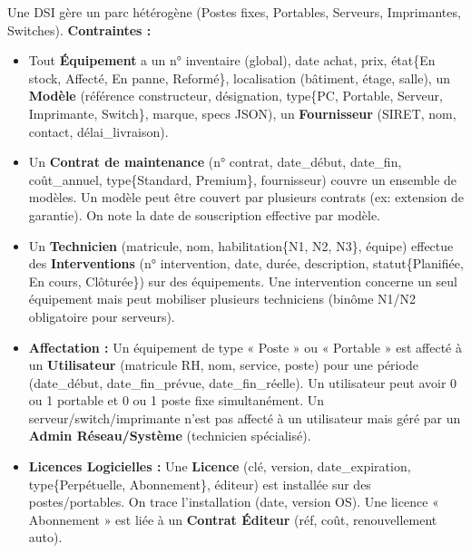 \documentclass[11pt]{article}
\begin{document}
\begin{exercice}
Une DSI gère un parc hétérogène (Postes fixes, Portables, Serveurs, Imprimantes, Switches). 
\textbf{Contraintes :}
\begin{itemize}
    \item Tout \textbf{Équipement} a un n° inventaire (global), date achat, prix, état\{En stock, Affecté, En panne, Reformé\}, localisation (bâtiment, étage, salle), un \textbf{Modèle} (référence constructeur, désignation, type\{PC, Portable, Serveur, Imprimante, Switch\}, marque, specs JSON), un \textbf{Fournisseur} (SIRET, nom, contact, délai\_livraison).
    \item Un \textbf{Contrat de maintenance} (n° contrat, date\_début, date\_fin, coût\_annuel, type\{Standard, Premium\}, fournisseur) couvre un ensemble de modèles. Un modèle peut être couvert par plusieurs contrats (ex: extension de garantie). On note la date de souscription effective par modèle.
    \item Un \textbf{Technicien} (matricule, nom, habilitation\{N1, N2, N3\}, équipe) effectue des \textbf{Interventions} (n° intervention, date, durée, description, statut\{Planifiée, En cours, Clôturée\}) sur des équipements. Une intervention concerne un seul équipement mais peut mobiliser plusieurs techniciens (binôme N1/N2 obligatoire pour serveurs).
    \item \textbf{Affectation :} Un équipement de type « Poste » ou « Portable » est affecté à un \textbf{Utilisateur} (matricule RH, nom, service, poste) pour une période (date\_début, date\_fin\_prévue, date\_fin\_réelle). Un utilisateur peut avoir 0 ou 1 portable et 0 ou 1 poste fixe simultanément. Un serveur/switch/imprimante n'est pas affecté à un utilisateur mais géré par un \textbf{Admin Réseau/Système} (technicien spécialisé).
    \item \textbf{Licences Logicielles :} Une \textbf{Licence} (clé, version, date\_expiration, type\{Perpétuelle, Abonnement\}, éditeur) est installée sur des postes/portables. On trace l'installation (date, version OS). Une licence « Abonnement » est liée à un \textbf{Contrat Éditeur} (réf, coût, renouvellement auto).
\end{itemize}


\end{exercice}
\end{document}
